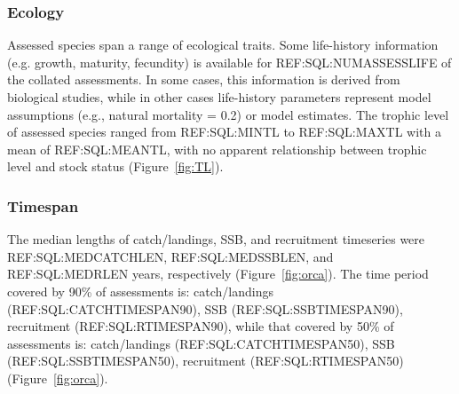 

\subsubsection*{Ecology}
Assessed species span a range of ecological traits. Some life-history
information (e.g. growth, maturity, fecundity) is available for
REF:SQL:NUMASSESSLIFE of the collated assessments. In some cases, this
information is derived from biological studies, while in other cases
life-history parameters represent model assumptions (e.g., natural
mortality = 0.2) or model estimates. The trophic level of assessed
species ranged from REF:SQL:MINTL to REF:SQL:MAXTL with a mean of
REF:SQL:MEANTL, with no apparent relationship between trophic level and stock status (Figure~\ref{fig:TL}).




\subsubsection*{Timespan }


The median lengths of catch/landings, SSB, and recruitment timeseries
were REF:SQL:MEDCATCHLEN, REF:SQL:MEDSSBLEN, and REF:SQL:MEDRLEN
years, respectively (Figure~\ref{fig:orca}).  The time period covered by 90\% of assessments
is: catch/landings (REF:SQL:CATCHTIMESPAN90), SSB
(REF:SQL:SSBTIMESPAN90), recruitment (REF:SQL:RTIMESPAN90), while that
covered by 50\% of assessments is: catch/landings
(REF:SQL:CATCHTIMESPAN50), SSB (REF:SQL:SSBTIMESPAN50), recruitment
(REF:SQL:RTIMESPAN50) (Figure~\ref{fig:orca}).


